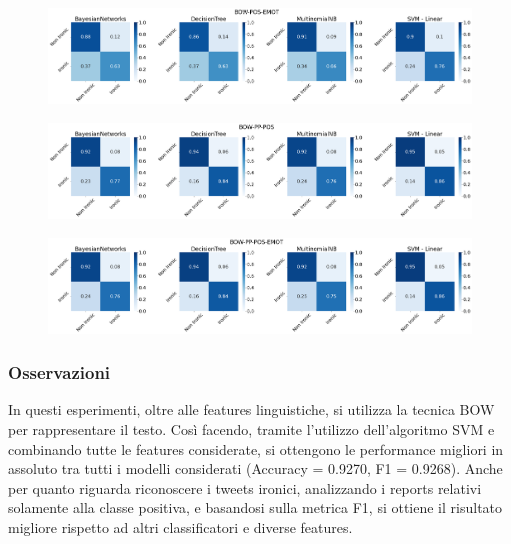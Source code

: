 \documentclass[oneside]{book}
\begin{document}
\begin{figure}[H]
	\centering
	\includegraphics[width=13cm]{assets/reports/conf-matrix/bow/bow-pos-emot.png}
\end{figure}
\vspace*{-0.8cm}

\begin{figure}[H]
	\centering
	\includegraphics[width=13cm]{assets/reports/conf-matrix/bow/bow-pp-pos.png}
\end{figure}
\vspace*{-0.8cm}

\begin{figure}[H]
	\centering
	\includegraphics[width=13cm]{assets/reports/conf-matrix/bow/bow-pp-pos-emot.png}
\end{figure}
\vspace*{-0.8cm}
\restoregeometry
\newpage
\subsubsection{Osservazioni}
In questi esperimenti, oltre alle features linguistiche, si utilizza la tecnica BOW per rappresentare il testo. Così facendo, tramite l'utilizzo dell'algoritmo SVM e combinando tutte le features considerate, si ottengono le performance migliori in assoluto tra tutti i modelli considerati (Accuracy = 0.9270, F1 = 0.9268). Anche per quanto riguarda riconoscere i tweets ironici, analizzando i reports relativi solamente alla classe positiva, e basandosi sulla metrica F1, si ottiene il risultato migliore rispetto ad altri classificatori e diverse features.
\end{document}
